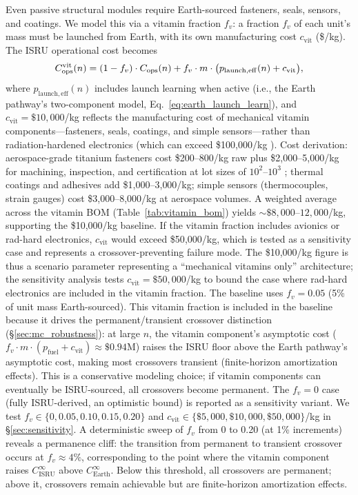 \documentclass[5p,twocolumn]{elsarticle}
\begin{document}
Even passive structural modules require Earth-sourced fasteners, seals, sensors, and coatings. We model this via a vitamin fraction $f_v$: a fraction $f_v$ of each unit's mass must be launched from Earth, with its own manufacturing cost $c_{\mathrm{vit}}$ (\$/kg). The ISRU operational cost becomes
\begin{equation}\small
  C_{\mathrm{ops}}^{\mathrm{vit}}(n) = (1 - f_v) \cdot C_{\mathrm{ops}}(n) + f_v \cdot m \cdot \bigl(p_{\mathrm{launch,eff}}(n) + c_{\mathrm{vit}}\bigr),
  \label{eq:vitamin}
\end{equation}
where $p_{\mathrm{launch,eff}}(n)$ includes launch learning when active (i.e., the Earth pathway's two-component model, Eq.~\ref{eq:earth_launch_learn}), and $c_{\mathrm{vit}} = \$10{,}000$/kg reflects the manufacturing cost of mechanical vitamin components---fasteners, seals, coatings, and simple sensors---rather than radiation-hardened electronics (which can exceed \$100{,}000/kg \cite{wertz2011}). Cost derivation: aerospace-grade titanium fasteners cost \$200--800/kg raw plus \$2{,}000--5{,}000/kg for machining, inspection, and certification at lot sizes of $10^2$--$10^3$ \cite{wertz2011}; thermal coatings and adhesives add \$1{,}000--3{,}000/kg; simple sensors (thermocouples, strain gauges) cost \$3{,}000--8{,}000/kg at aerospace volumes. A weighted average across the vitamin BOM (Table~\ref{tab:vitamin_bom}) yields ${\sim}\$8{,}000$--$12{,}000$/kg, supporting the \$10{,}000/kg baseline. If the vitamin fraction includes avionics or rad-hard electronics, $c_{\mathrm{vit}}$ would exceed \$50{,}000/kg, which is tested as a sensitivity case and represents a crossover-preventing failure mode. The \$10{,}000/kg figure is thus a scenario parameter representing a ``mechanical vitamins only'' architecture; the sensitivity analysis tests $c_{\mathrm{vit}} = \$50{,}000$/kg to bound the case where rad-hard electronics are included in the vitamin fraction. The baseline uses $f_v = 0.05$ (5\% of unit mass Earth-sourced). This vitamin fraction is included in the baseline because it drives the permanent/transient crossover distinction (\S\ref{sec:mc_robustness}): at large $n$, the vitamin component's asymptotic cost ($f_v \cdot m \cdot (p_{\mathrm{fuel}} + c_{\mathrm{vit}}) \approx \$0.94$M) raises the ISRU floor above the Earth pathway's asymptotic cost, making most crossovers transient (finite-horizon amortization effects). This is a conservative modeling choice; if vitamin components can eventually be ISRU-sourced, all crossovers become permanent. The $f_v = 0$ case (fully ISRU-derived, an optimistic bound) is reported as a sensitivity variant. We test $f_v \in \{0, 0.05, 0.10, 0.15, 0.20\}$ and $c_{\mathrm{vit}} \in \{\$5{,}000, \$10{,}000, \$50{,}000\}$/kg in \S\ref{sec:sensitivity}. A deterministic sweep of $f_v$ from 0 to 0.20 (at 1\% increments) reveals a permanence cliff: the transition from permanent to transient crossover occurs at $f_v \approx 4\%$, corresponding to the point where the vitamin component raises $C_{\mathrm{ISRU}}^{\infty}$ above $C_{\mathrm{Earth}}^{\infty}$. Below this threshold, all crossovers are permanent; above it, crossovers remain achievable but are finite-horizon amortization effects.
\end{document}
